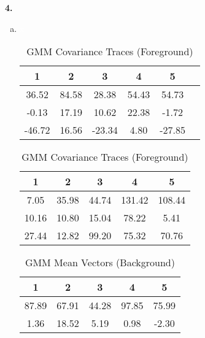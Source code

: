 \documentclass{article}
\begin{document}
\textbf{4.} \begin{enumerate}[(a)]
    \item \textcolor{white}{{x}}
    \begin{table}[H]
        \centering
        \captionsetup{width=0.8\linewidth} %
        \begin{minipage}[b]{0.45\linewidth}
            \centering
            \caption{GMM Mean Vectors (Foreground)}
            \begin{tabular}{@{}cccccc@{}}
                \toprule
                 1 & 2 & 3 & 4 & 5\\ \midrule
                 36.52 & 84.58 & 28.38 & 54.43 & 54.73\\
                 -0.13 & 17.19 & 10.62 & 22.38 & -1.72\\
                 -46.72 & 16.56 & -23.34 & 4.80 & -27.85\\ \bottomrule
            \end{tabular}
        \end{minipage}
        \hfill
        \begin{minipage}[b]{0.45\linewidth}
            \centering
            \caption{GMM Covariance Traces (Foreground)}
            \begin{tabular}{@{}ccccc@{}}
                \toprule
                1 & 2 & 3 & 4 & 5\\ \midrule
                7.05 & 35.98 & 44.74 & 131.42 & 108.44\\
                10.16 & 10.80 & 15.04 & 78.22 & 5.41 \\
                27.44 & 12.82 & 99.20 & 75.32 & 70.76\\ \bottomrule
            \end{tabular}
        \end{minipage}
    \end{table}
    \begin{table}[H]
        \centering
        \captionsetup{width=0.8\linewidth} %
        \begin{minipage}[b]{0.45\linewidth}
            \centering
            \caption{GMM Mean Vectors (Background)}
            \begin{tabular}{@{}ccccc@{}}
                \toprule
                1 & 2 & 3 & 4 & 5 \\ \midrule
                87.89 & 67.91 & 44.28 & 97.85 & 75.99\\
                1.36 & 18.52 & 5.19 & 0.98 & -2.30 \\

\end{tabular}
\end{minipage}
\end{table}
\end{enumerate}
\end{document}
